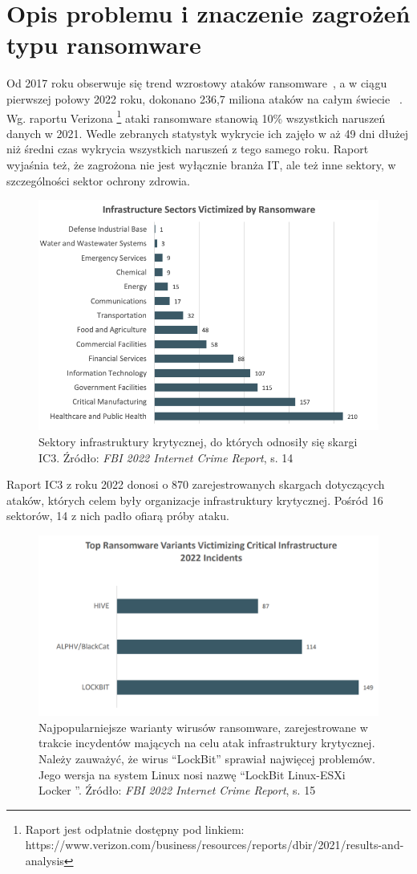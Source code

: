 \section{Opis problemu i znaczenie zagrożeń typu ransomware}
 Od 2017 roku obserwuje się trend wzrostowy ataków ransomware~\cite{petrosyan_worldwide_nodate}, a w ciągu pierwszej połowy 2022 roku, dokonano 236,7 miliona ataków na całym świecie 
 ~\cite{petrosyan_number_nodate}. Wg. raportu Verizona \footnote{Raport jest odpłatnie dostępny pod linkiem: https://www.verizon.com/business/resources/reports/dbir/2021/results-and-analysis} ataki ransomware stanowią 10\% wszystkich naruszeń danych w 2021. Wedle zebranych statystyk wykrycie ich zajęło w aż 49 dni dłużej niż średni czas wykrycia wszystkich naruszeń z tego samego roku. Raport wyjaśnia też, że zagrożona nie jest wyłącznie branża IT, ale też inne sektory, w szczególności sektor ochrony zdrowia.
\begin{figure}[H]
     \centering
     \includegraphics[width=0.78\linewidth]{rysunki/attacks_on_sectors.png}
     \caption{Sektory infrastruktury krytycznej, do których odnosiły się skargi IC3. Źródło: \emph{FBI 2022 Internet Crime Report}, s. 14}
     \label{fig:enter-label}
 \end{figure}
 Raport IC3 z roku 2022 donosi o 870 zarejestrowanych skargach dotyczących ataków, których celem były organizacje infrastruktury krytycznej. Pośród 16 sektorów, 14 z nich padło ofiarą próby ataku.
  \begin{figure}[H]
     \centering
     \includegraphics[width=0.75\linewidth]{rysunki/topransomwares2022.png}
     \caption{Najpopularniejsze warianty wirusów ransomware, zarejestrowane w trakcie incydentów mających na celu atak infrastruktury krytycznej. Należy zauważyć, że wirus \foreignquote{english}{LockBit} sprawiał najwięcej problemów. Jego wersja na system Linux nosi nazwę \foreignquote{english}{LockBit Linux-ESXi Locker }. Źródło: \emph{FBI 2022 Internet Crime Report}, s. 15}
     \label{fig:enter-label}
 \end{figure}
